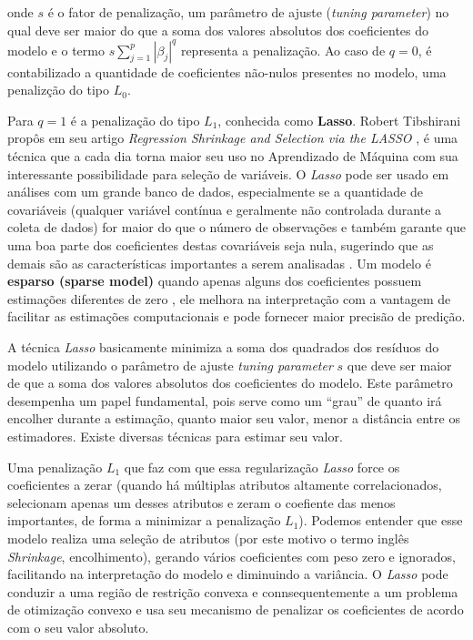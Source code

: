 \documentclass[
  openany]{book}
\begin{document}
onde \(s\) é o fator de penalização, um parâmetro de ajuste (\emph{tuning parameter}) no qual deve ser maior do que a soma dos valores absolutos dos coeficientes do modelo e o termo \(s\displaystyle \sum^p_{j=1}|\beta_j|^q\) representa a penalização. Ao caso de \(q=0\), é contabilizado a quantidade de coeficientes não-nulos presentes no modelo, uma penalizção do tipo \textbf{\(L_0\)}.

Para \(q=1\) é a penalização do tipo \textbf{\(L_1\)}, conhecida como \textbf{Lasso}. Robert Tibshirani propôs em seu artigo \emph{Regression Shrinkage and Selection via the LASSO} \citep{tibshirani1996regression}, é uma técnica que a cada dia torna maior seu uso no Aprendizado de Máquina com sua interessante possibilidade para seleção de variáveis. O \emph{Lasso} pode ser usado em análises com um grande banco de dados, especialmente se a quantidade de covariáveis (qualquer variável contínua e geralmente não controlada durante a coleta de dados) for maior do que o número de observações e também garante que uma boa parte dos coeficientes destas covariáveis seja nula, sugerindo que as demais são as características importantes a serem analisadas \citep{silva2018tecnica}. Um modelo é \textbf{esparso (sparse model)} quando apenas alguns dos coeficientes possuem estimações diferentes de zero \citep{hastie2015statistical}, ele melhora na interpretação com a vantagem de facilitar as estimações computacionais e pode fornecer maior precisão de predição.

A técnica \emph{Lasso} basicamente minimiza a soma dos quadrados dos resíduos do modelo utilizando o parâmetro de ajuste \emph{tuning parameter} \(s\) que deve ser maior de que a soma dos valores absolutos dos coeficientes do modelo. Este parâmetro desempenha um papel fundamental, pois serve como um ``grau'' de quanto irá encolher durante a estimação, quanto maior seu valor, menor a distância entre os estimadores. Existe diversas técnicas para estimar seu valor.

Uma penalização \textbf{\(L_1\)} que faz com que essa regularização \emph{Lasso} force os coeficientes a zerar (quando há múltiplas atributos altamente correlacionados, selecionam apenas um desses atributos e zeram o coefiente das menos importantes, de forma a minimizar a penalização \(L_1\)). Podemos entender que esse modelo realiza uma seleção de atributos (por este motivo o termo inglês \emph{Shrinkage}, encolhimento), gerando vários coeficientes com peso zero e ignorados, facilitando na interpretação do modelo e diminuindo a variância. O \emph{Lasso} pode conduzir a uma região de restrição convexa e connsequentemente a um problema de otimização convexo e usa seu mecanismo de penalizar os coeficientes de acordo com o seu valor absoluto.
\end{document}
